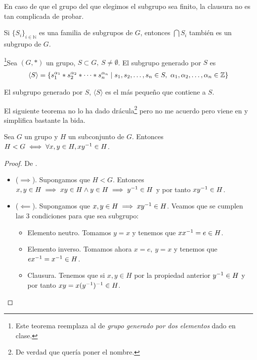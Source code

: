 En caso de que el grupo del que elegimos el subgrupo sea finito, la clausura no es tan complicada de probar.

\begin{pro}
	Si $\{S_i\}_{i \in \mathbb{N}}$ es una familia de subgrupos de $G$, entonces $\bigcap S_i$ también es un subgrupo de $G$.
\end{pro}



\begin{dfn}
	\footnote{Este teorema reemplaza al de \textit{grupo generado por dos elementos} dado en clase.}Sea $(G, \ast)$ un grupo, $S \subset G,\ S \neq \emptyset$. El subgrupo generado por $S$ es
	\begin{align}
	\langle S \rangle = \{s_1^{\alpha_1} \ast s_2^{\alpha_2} \ast \dots \ast s_n^{\alpha_n} \mid s_1, s_2, \dots, s_n \in S,\ \alpha_1, \alpha_2, \dots, \alpha_n \in \mathbb{Z} \}
	\end{align}
\end{dfn}

\begin{pro}
	El subgrupo generado por $S$, $\langle S \rangle$ es el más pequeño que contiene a $S$.
\end{pro}

El siguiente teorema no lo ha dado drácula\footnote{De verdad que quería poner el nombre.} pero no me acuerdo pero viene en \cite{dor96} y simplifica bastante la bida.

\begin{thm}
	\label{thm:subgrupoxinverso}
	Sea $G$ un grupo y $H$ un subconjunto de $G$. Entonces $H < G \iff \forall x,y \in H, xy^{-1} \in H$.
\end{thm}

\begin{proof}
	De \cite{dor96}.
	\begin{itemize}
		\item ($\implies$). Supongamos que $H < G$. Entonces $x,y \in H \implies xy \in H \land y \in H \implies y^{-1} \in H$ y por tanto $xy^{-1} \in H$.
		\item ($\impliedby$). Supongamos que $x,y \in H \implies xy^{-1} \in H$. Veamos que se cumplen las 3 condiciones para que sea subgrupo:
		\begin{itemize}
			\item Elemento neutro. Tomamos $y = x$ y tenemos que $xx^{-1} = e \in H$.
			\item Elemento inverso. Tomamos ahora $x = e,\ y = x$ y tenemos que $ex^{-1} = x^{-1} \in H$.
			\item Clausura. Tenemos que si $x,y \in H$ por la propiedad anterior $y^{-1} \in H$ y por tanto $xy = x(y^{-1})^{-1} \in H$.
		\end{itemize}
	\end{itemize}
\end{proof}

